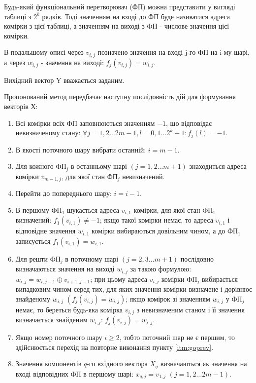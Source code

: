 \documentclass[12pt]{article}
\begin{document}
Будь-який функціональний перетворювач (ФП) можна представити у вигляді таблиці з $2^k$ рядків. Тоді значенням на вході до ФП буде називатися адреса комірки з цієї таблиці, а значенням на виході з ФП - числове значення цієї комірки.

В подальшому описі через $v_{i,j}$ позначено значення на вході j-го ФП на i-му шарі, а через $w_{i,j}$ - значення на виході: $f_j(v_{i,j}) = w_{i,j}$.

Вихідний вектор Y вважається заданим.

Пропонований метод передбачає наступну послідовність дій для формування векторів Х:

\begin{enumerate}
\item Всі комірки всіх ФП заповнюються значенням $-1$, що відповідає невизначеному стану: $\forall j=1,2 \ldots 2m-1, l=0,1 \ldots 2^k-1 : f_j(l) = -1$.
\item \label{itm:start} В якості поточного шару вибрати останній: $i=m-1$.
\item \label{itm:findundef}Для кожного ФП$_j$ в останньому шарі $(j=1,2 \ldots m+1)$ знаходиться адреса комірки $v_{m-1,j}$, для якої стан ФП$_j$ невизначений.
\item \label{itm:goprev} Перейти до попереднього шару: $i=i-1$.
\item В першому ФП$_1$ шукається адреса $v_{i,1}$ комірки, для якої стан ФП$_1$ визначений: $f_1(v_{i,1}) \neq -1$;
якщо такої комірки немає, то адреса $v_{i,1}$ і відповідне значення $w_{i,1}$ комірки вибираються довільним чином, а до ФП$_1$ записується $f_1(v_{i,1})=w_{i,1}$.
\item Для решти ФП$_j$ в поточному шарі $(j=2,3 \ldots m+1)$ послідовно визначаються значення на виході $w_{i,j}$ за такою формулою: $w_{i,j} = w_{i,j-1} \oplus v_{i+1,j-1}$;
при цьому адреса $v_{i,j}$ комірки ФП$_j$ вибирається випадковим чином серед тих, для яких значення комірки визначене і дорівнює знайденому $w_{i,j}$ $(f_j(v_{i,j})=w_{i,j})$;
якщо комірок зі значенням $w_{i,j}$ у ФП$_j$ немає, то береться будь-яка комірка $v_{i,j}$ з невизначеним станом і її значення визначається знайденим $w_{i,j}$: $f_j(v_{i,j})=w_{i,j}$.
\item Якщо номер поточного шару $i \geq 2$, тобто поточний шар не є першим, то здійснюється перехід на повторне виконання пункту \ref{itm:goprev}.
\item Значення компонентів $q$-го вхідного вектора $X_q$ визначаються як значення на вході відповідних ФП в першому шарі: $x_{q,j}=v_{1,j}$ $(j=1,2 \ldots 2m-1)$.

\end{enumerate}
\end{document}
